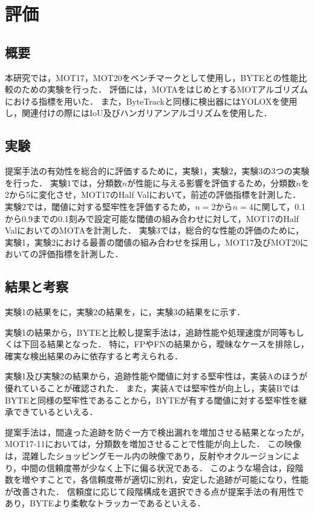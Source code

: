 \documentclass[a4paper,10pt,twocolumn,uplatex]{jsarticle}
\begin{document}
\section{評価}
\subsection{概要}
本研究では，MOT17，MOT20\cite{MOT}をベンチマークとして使用し，BYTEとの性能比較のための実験を行った．
評価には，MOTAをはじめとするMOTアルゴリズムにおける指標を用いた．
また，ByteTrackと同様に検出器にはYOLOXを使用し，関連付けの際にはIoU及びハンガリアンアルゴリズムを使用した．
\subsection{実験}
提案手法の有効性を総合的に評価するために，実験1，実験2，実験3の3つの実験を行った．
実験1では，分類数$n$が性能に与える影響を評価するため，分類数$n$を2から5に変化させ，MOT17のHalf Valにおいて，前述の評価指標を計測した．
実験2では，閾値に対する堅牢性を評価するため，$n=2$から$n=4$に関して，0.1から0.9までの0.1刻みで設定可能な閾値の組み合わせに対して，MOT17のHalf ValにおいてのMOTAを計測した．
実験3では，総合的な性能の評価のために，実験1，実験2における最善の閾値の組み合わせを採用し，MOT17及びMOT20においての評価指標を計測した．
\subsection{結果と考察}
実験1の結果をに，実験2の結果を，に，実験3の結果をに示す．
\par
実験1の結果から，BYTEと比較し提案手法は，追跡性能や処理速度が同等もしくは下回る結果となった．
特に，FPやFNの結果から，曖昧なケースを排除し，確実な検出結果のみに依存すると考えられる．
\par
実験1及び実験2の結果から，追跡性能や閾値に対する堅牢性は，実装Aのほうが優れていることが確認された．
また，実装Aでは堅牢性が向上し，実装BではBYTEと同様の堅牢性であることから，BYTEが有する閾値に対する堅牢性を継承できているといえる．
\par
提案手法は，間違った追跡を防ぐ一方で検出漏れを増加させる結果となったが，MOT17-11においては，分類数を増加させることで性能が向上した．
この映像は，混雑したショッピングモール内の映像であり，反射やオクルージョンにより，中間の信頼度帯が少なく上下に偏る状況である．
このような場合は，段階数を増やすことで，各信頼度帯が適切に別れ，安定した追跡が可能になり，性能が改善された．
信頼度に応じて段階構成を選択できる点が提案手法の有用性であり，BYTEより柔軟なトラッカーであるといえる．
\end{document}
